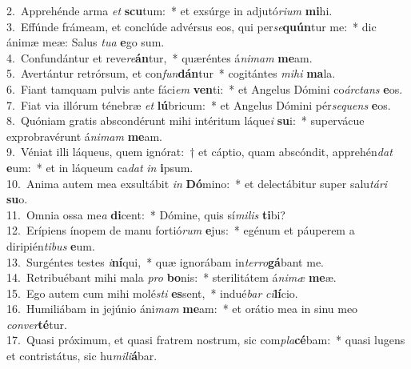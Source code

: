 {2.~}Apprehénde arma \textit{et} \textbf{scu}tum:~* et exsúrge in adjutó\textit{ri}\textit{um} \textbf{mi}hi.\\
{3.~}Effúnde frámeam, et conclúde advérsus eos, qui per\textit{se}\textbf{quún}tur me:~* dic ánimæ meæ: Salus \textit{tu}\textit{a} \textbf{e}go sum.\\
{4.~}Confundántur et reve\textit{re}\textbf{án}tur,~* quæréntes á\textit{ni}\textit{mam} \textbf{me}am.\\
{5.~}Avertántur retrórsum, et con\textit{fun}\textbf{dán}tur~* cogitántes \textit{mi}\textit{hi} \textbf{ma}la.\\
{6.~}Fiant tamquam pulvis ante fáci\textit{em} \textbf{ven}ti:~* et Angelus Dómini co\textit{ár}\textit{ctans} \textbf{e}os.\\
{7.~}Fiat via illórum ténebræ \textit{et} \textbf{lú}bricum:~* et Angelus Dómini pér\textit{se}\textit{quens} \textbf{e}os.\\
{8.~}Quóniam gratis abscondérunt mihi intéritum láque\textit{i} \textbf{su}i:~* supervácue exprobravérunt á\textit{ni}\textit{mam} \textbf{me}am.\\
{9.~}Véniat illi láqueus, quem ignórat:~† et cáptio, quam abscóndit, apprehén\textit{dat} \textbf{e}um:~* et in láqueum ca\textit{dat} \textit{in} \textbf{i}psum.\\
{10.~}Anima autem mea exsultábit \textit{in} \textbf{Dó}mino:~* et delectábitur super salu\textit{tá}\textit{ri} \textbf{su}o.\\
{11.~}Omnia ossa me\textit{a} \textbf{di}cent:~* Dómine, quis sí\textit{mi}\textit{lis} \textbf{ti}bi?\\
{12.~}Erípiens ínopem de manu fortió\textit{rum} \textbf{e}jus:~* egénum et páuperem a diripién\textit{ti}\textit{bus} \textbf{e}um.\\
{13.~}Surgéntes testes \textit{i}\textbf{ní}qui,~* quæ ignorábam in\textit{ter}\textit{ro}\textbf{gá}bant me.\\
{14.~}Retribuébant mihi mala \textit{pro} \textbf{bo}nis:~* sterilitátem á\textit{ni}\textit{mæ} \textbf{me}æ.\\
{15.~}Ego autem cum mihi molé\textit{sti} \textbf{es}sent,~* indué\textit{bar} \textit{ci}\textbf{lí}cio.\\
{16.~}Humiliábam in jejúnio áni\textit{mam} \textbf{me}am:~* et orátio mea in sinu meo \textit{con}\textit{ver}\textbf{té}tur.\\
{17.~}Quasi próximum, et quasi fratrem nostrum, sic com\textit{pla}\textbf{cé}bam:~* quasi lugens et contristátus, sic hu\textit{mi}\textit{li}\textbf{á}bar.\\
